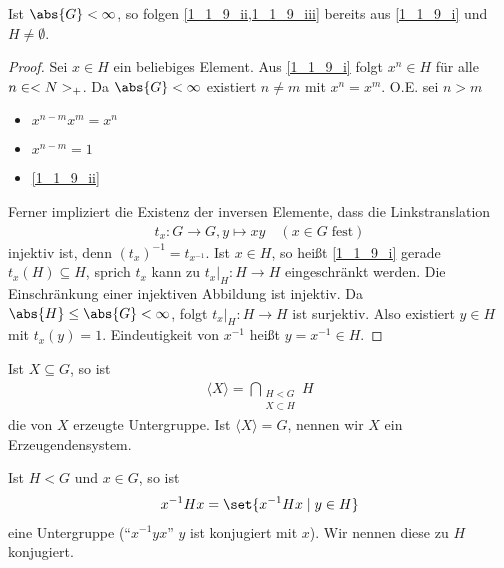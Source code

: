\begin{proposition}
	Ist $\abs{G} < \infty$, so folgen \cref{1_1_9_ii,1_1_9_iii} bereits aus \cref{1_1_9_i} und $H \neq \emptyset$.
\end{proposition}
\begin{proof}
	Sei $x \in H$ ein beliebiges Element. Aus \ref{1_1_9_i} folgt $x^n \in H$ für alle $n \in <N>_{+}$. Da $\abs{G} < \infty$ existiert $n\neq m$ mit $x^n = x^m$. O.E. sei $n > m$ \begin{itemize}[label={$\Rightarrow$},topsep=-\parskip]
		 \item $x^{n-m} x^m = x^n$
		 \item $x^{n-m} = 1$
		 \item \ref{1_1_9_ii}
	\end{itemize}
	Ferner impliziert die Existenz der inversen Elemente, dass die Linkstranslation \begin{align*}
		t_x\colon G \to G, y \mapsto xy\quad(x\in G\;\text{fest})
	\end{align*}
	injektiv ist, denn $(t_x)^{-1} = t_{x^{-1}}$. Ist $x \in H$, so heißt \ref{1_1_9_i} gerade $t_x(H) \subseteq H$, sprich $t_x$ kann zu $t_x\big|_H\colon H \to H$ eingeschränkt werden. Die Einschränkung einer injektiven Abbildung ist injektiv. Da $\abs{H} \le \abs{G} < \infty$, folgt $t_x\big|_H\colon H \to H$ ist surjektiv. Also existiert $y \in H$ mit $t_x(y)= 1$. Eindeutigkeit von $x^{-1}$ heißt $y = x^{-1} \in H$.
\end{proof}

\begin{definition}[Erzeugendensystem]
	Ist $X \subseteq G$, so ist
	\begin{align*}
		\langle X \rangle = \bigcap_{\substack{H < G\\X \subset H}} H
	\end{align*}
	die von $X$ erzeugte Untergruppe. Ist $\langle X \rangle = G$, nennen wir $X$ ein Erzeugendensystem.
\end{definition}

\begin{definition}[Konjugation]
	Ist $H < G$ und $x \in G$, so ist\begin{align*}
		x^{-1}Hx = \set{x^{-1}Hx\mid y \in H}
	\end{align*}
	eine Untergruppe ("`$x^{-1}yx$"' $y$ ist konjugiert mit $x$). Wir nennen diese zu $H$ konjugiert.
\end{definition}

